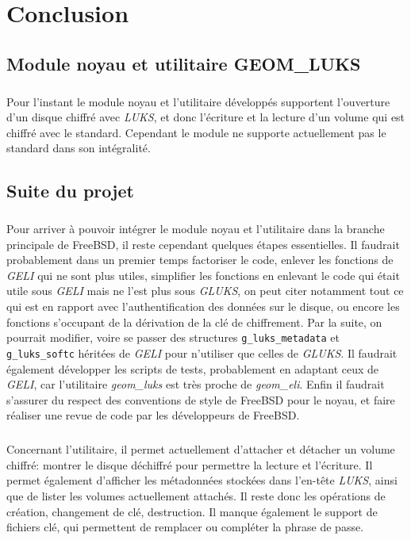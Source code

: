 \chapter{Conclusion}
\section{Module noyau et utilitaire GEOM\_LUKS}

\paragraph{}
Pour l'instant le module noyau et l'utilitaire développés supportent l'ouverture
d'un disque chiffré avec {\em LUKS}, et donc l'écriture et la lecture d'un
volume qui est chiffré avec le standard. Cependant le module ne supporte
actuellement pas le standard dans son intégralité.


\section{Suite du projet}
\paragraph{}
Pour arriver à pouvoir intégrer le module noyau et l'utilitaire dans la branche
principale de FreeBSD, il reste cependant quelques étapes essentielles. Il
faudrait probablement dans un premier temps factoriser le code, enlever les
fonctions de {\em GELI} qui ne sont plus utiles, simplifier les fonctions en
enlevant le code qui était utile sous {\em GELI} mais ne l'est plus sous
{\em GLUKS}, on peut citer notamment tout ce qui est en rapport avec
l'authentification des données sur le disque, ou encore les fonctions s'occupant
de la dérivation de la clé de chiffrement. Par la suite, on pourrait modifier,
voire se passer des structures \texttt{g\_luks\_metadata} et
\texttt{g\_luks\_softc} héritées de {\em GELI} pour n'utiliser que celles de
{\em GLUKS}. Il faudrait également développer les scripts de tests, probablement
en adaptant ceux de {\em   GELI}, car l'utilitaire {\em geom\_luks} est très
proche de {\em geom\_eli}. Enfin il faudrait s'assurer du respect des
conventions de style de FreeBSD pour le noyau, et faire réaliser une revue de
code par les développeurs de FreeBSD.

\paragraph{}
Concernant l'utilitaire, il permet actuellement d'attacher et détacher un volume
chiffré: montrer le disque déchiffré pour permettre la lecture et l'écriture. Il
permet également d'afficher les métadonnées stockées dans l'en-tête {\em LUKS},
ainsi que de lister les volumes actuellement attachés. Il reste donc les
opérations de création, changement de clé, destruction. Il manque également le
support de fichiers clé, qui permettent de remplacer ou compléter la phrase de
passe.

